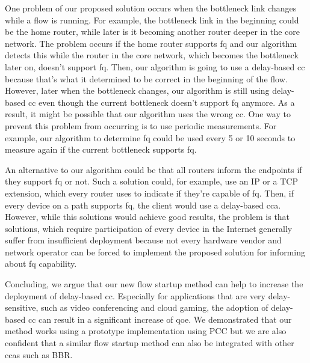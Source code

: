 \documentclass[runningheads]{llncs}
\begin{document}
One problem of our proposed solution occurs when the bottleneck link changes while a flow is running. For example, the bottleneck link in the beginning could be the home router, while later is it becoming another router deeper in the core network. The problem occurs if the home router supports \gls{fq} and our algorithm detects this while the router in the core network, which becomes the bottleneck later on, doesn't support \gls{fq}. Then, our algorithm is going to use a delay-based \gls{cc} because that's what it determined to be correct in the beginning of the flow. However, later when the bottleneck changes, our algorithm is still using delay-based \gls{cc} even though the current bottleneck doesn't support \gls{fq} anymore. As a result, it might be possible that our algorithm uses the wrong \gls{cc}. One way to prevent this problem from occurring is to use periodic measurements. For example, our algorithm to determine \gls{fq} could be used every 5 or 10 seconds to measure again if the current bottleneck supports \gls{fq}. 

An alternative to our algorithm could be that all routers inform the endpoints if they support \gls{fq} or not. Such a solution could, for example, use an IP or a TCP extension, which every router uses to indicate if they're capable of \gls{fq}. Then, if every device on a path supports \gls{fq}, the client would use a delay-based \gls{cca}. However, while this solutions would achieve good results, the problem is that solutions, which require participation of every device in the Internet generally suffer from insufficient deployment because not every hardware vendor and network operator can be forced to implement the proposed solution for informing about \gls{fq} capability. 

Concluding, we argue that our new flow startup method can help to increase the deployment of delay-based \gls{cc}. Especially for applications that are very delay-sensitive, such as video conferencing and cloud gaming, the adoption of delay-based \gls{cc} can result in a significant increase of \gls{qoe}. We demonstrated that our method works using a prototype implementation using PCC but we are also confident that a similar flow startup method can also be integrated with other \glspl{cca} such as BBR. 



\end{document}
